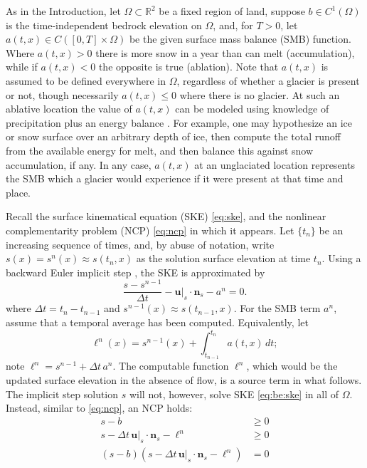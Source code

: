 \documentclass[hidelinks,onefignum,onetabnum,final]{siamart220329}  %
\newcommand{\RR}{\mathbb{R}}
\newcommand{\bn}{\mathbf{n}}
\newcommand{\bu}{\mathbf{u}}
\begin{document}
As in the Introduction, let $\Omega \subset \RR^2$ be a fixed region of land, suppose $b \in C^1(\Omega)$ is the time-independent bedrock elevation on $\Omega$, and, for $T>0$, let $a(t,x) \in C([0,T] \times \Omega)$ be the given surface mass balance (SMB) function.  Where $a(t,x)>0$ there is more snow in a year than can melt (accumulation), while if $a(t,x)<0$ the opposite is true (ablation).  Note that $a(t,x)$ is assumed to be defined everywhere in $\Omega$, regardless of whether a glacier is present or not, though necessarily $a(t,x) \le 0$ where there is no glacier.  At such an ablative location the value of $a(t,x)$ can be modeled using knowledge of precipitation plus an energy balance \cite{GreveBlatter2009}.  For example, one may hypothesize an ice or snow surface over an arbitrary depth of ice, then compute the total runoff from the available energy for melt, and then balance this against snow accumulation, if any.  In any case, $a(t,x)$ at an unglaciated location represents the SMB which a glacier would experience if it were present at that time and place.

Recall the surface kinematical equation (SKE) \eqref{eq:ske}, and the nonlinear complementarity problem (NCP) \eqref{eq:ncp} in which it appears.  Let $\{t_n\}$ be an increasing sequence of times, and, by abuse of notation, write $s(x) = s^n(x)\approx s(t_n,x)$ as the solution surface elevation at time $t_n$.  Using a backward Euler implicit step \cite{AscherPetzold1998}, the SKE is approximated by
\begin{equation}
\frac{s - s^{n-1}}{\Delta t} - \bu|_s \cdot \bn_s - a^n = 0. \label{eq:be:ske}
\end{equation}
where $\Delta t = t_n-t_{n-1}$ and $s^{n-1}(x) \approx s(t_{n-1},x)$.  For the SMB term $a^n$, assume that a temporal average has been computed.  Equivalently, let
\begin{equation}
\ell^n(x) = s^{n-1}(x) + \int_{t_{n-1}}^{t_n} a(t,x)\,dt; \label{eq:be:source}
\end{equation}
note $\ell^n=s^{n-1}+\Delta t\,a^n$.  The computable function $\ell^n$, which would be the updated surface elevation in the absence of flow, is a source term in what follows.  The implicit step solution $s$ will not, however, solve SKE \eqref{eq:be:ske} in all of $\Omega$.  Instead, similar to \eqref{eq:ncp}, an NCP holds:
\begin{subequations}
\label{eq:be:ncp}
\begin{align}
s - b &\ge 0 \label{eq:be:ncp:constraint} \\
s - \Delta t\,\bu|_s \cdot \bn_s - \ell^n &\ge 0 \\
(s - b) \left(s - \Delta t\,\bu|_s \cdot \bn_s - \ell^n\right) &= 0
\end{align}
\end{subequations}
\end{document}
